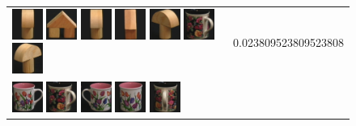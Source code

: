 \begin{figure}[tbp]
\begin{center}
\begin{tabular}{m{11cm} | m{3cm} |}
\includegraphics[width=1cm]{coil/beeld-5.eps}
\includegraphics[width=1cm]{coil/beeld-43.eps}
\includegraphics[width=1cm]{coil/beeld-2.eps}
\includegraphics[width=1cm]{coil/beeld-44.eps}
\includegraphics[width=1cm]{coil/beeld-4.eps}
\includegraphics[width=1cm]{coil/beeld-64.eps}
\includegraphics[width=1cm]{coil/beeld-3.eps}
& {\scriptsize 0.023809523809523808}
\\
\includegraphics[width=1cm]{coil/beeld-6.eps}
\includegraphics[width=1cm]{coil/beeld-64.eps}
\includegraphics[width=1cm]{coil/beeld-7.eps}
\includegraphics[width=1cm]{coil/beeld-8.eps}
\includegraphics[width=1cm]{coil/beeld-65.eps}

\end{tabular}
\end{center}
\end{figure}
